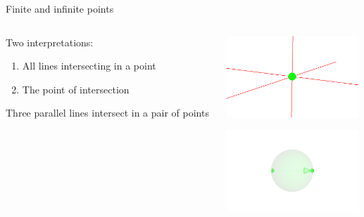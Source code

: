 \documentclass{beamer}
\begin{document}
\begin{frame}{Finite and infinite points}
  \begin{columns}
    \begin{column}{5cm}
      Two interpretations:
      \begin{enumerate}
        \item All lines intersecting in a point
        \item The point of intersection
      \end{enumerate}

      \bigskip

      Three parallel lines intersect in a pair of points
    \end{column}
    \begin{column}{5cm}
      \begin{center}
        \includegraphics[width=5cm]{point1}

        \includegraphics[width=5cm]{point2}
      \end{center}
    \end{column}
  \end{columns}
\end{frame}
\end{document}
